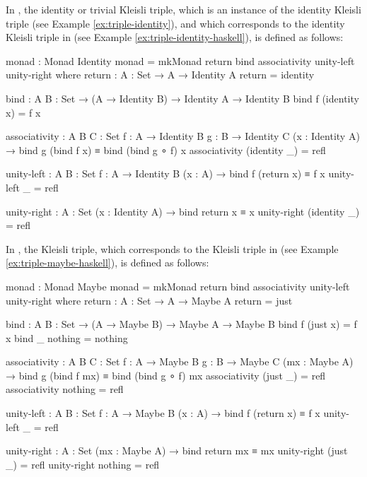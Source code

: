 \begin{example}
  \label{ex:triple-identity-agda}

  In \agda, the identity or trivial Kleisli triple, which is an
  instance of the identity Kleisli triple (see Example
  \ref{ex:triple-identity}), and which corresponds to the identity
  Kleisli triple in \hask (see Example
  \ref{ex:triple-identity-haskell}), is defined as follows:
  \begin{codeagda}
monad : Monad Identity
monad = mkMonad return bind associativity unity-left unity-right
  where
    return : {A : Set} → A → Identity A
    return = identity

    bind : {A B : Set} → (A → Identity B) → Identity A → Identity B
    bind f (identity x) = f x

    associativity : {A B C : Set} {f : A → Identity B} {g : B → Identity C}
                    (x : Identity A) → bind g (bind f x) ≡ bind (bind g ∘ f) x
    associativity (identity _) = refl

    unity-left : {A B : Set} {f : A → Identity B} (x : A) →
                 bind f (return x) ≡ f x
    unity-left _ = refl

    unity-right : {A : Set} (x : Identity A) → bind return x ≡ x
    unity-right (identity _) = refl
  \end{codeagda}
\end{example}

\begin{example}
  \label{ex:triple-maybe-agda}

  In \agda, the  Kleisli triple, which corresponds to
  the  Kleisli triple in \hask (see Example
  \ref{ex:triple-maybe-haskell}), is defined as follows:
  \begin{codeagda}
monad : Monad Maybe
monad = mkMonad return bind associativity unity-left unity-right
  where
    return : {A : Set} → A → Maybe A
    return = just

    bind : {A B : Set} → (A → Maybe B) → Maybe A → Maybe B
    bind f (just x) = f x
    bind _ nothing  = nothing

    associativity : {A B C : Set} {f : A → Maybe B} {g : B → Maybe C}
                    (mx : Maybe A) → bind g (bind f mx) ≡ bind (bind g ∘ f) mx
    associativity (just _) = refl
    associativity nothing  = refl

    unity-left : {A B : Set} {f : A → Maybe B} (x : A) →
                 bind f (return x) ≡ f x
    unity-left _ = refl

    unity-right : {A : Set} (mx : Maybe A) → bind return mx ≡ mx
    unity-right (just _) = refl
    unity-right nothing  = refl
  \end{codeagda}

\end{example}

